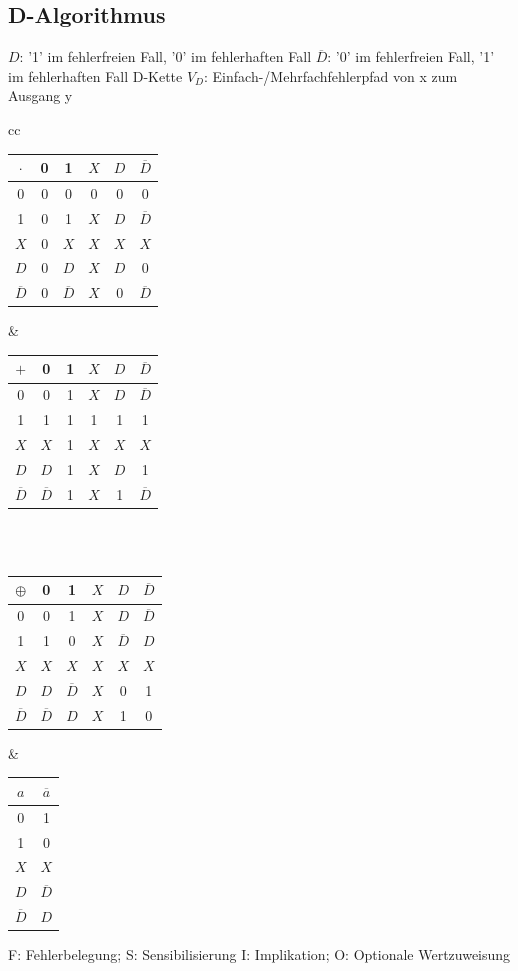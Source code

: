 \documentclass[a4paper,twocolumn,10pt]{article}
\begin{document}
\subsection*{D-Algorithmus}
$D$: '1' im fehlerfreien Fall, '0' im fehlerhaften Fall
$\overline{D}$: '0' im fehlerfreien Fall, '1' im fehlerhaften Fall
D-Kette $V_D$: Einfach-/Mehrfachfehlerpfad von x zum Ausgang y\newline
\begin{tabular}{cc}
\begin{tabular}{c|ccccc}
$\cdot$ & 0 & 1 & $X$ & $D$ & $\overline{D}$ \\ 
\hline 0 & 0 & 0 & 0 & 0 & 0 \\ 
1 & 0 & 1 & $X$ & $D$ & $\overline{D}$ \\ 
$X$ & 0 & $X$ & $X$ & $X$ & $X$ \\ 
$D$ & 0 & $D$ & $X$ & $D$ & 0 \\ 
$\overline{D}$ & 0 & $\overline{D}$ & $X$ & 0 & $\overline{D}$ \\  
\end{tabular} &        
\begin{tabular}{c|ccccc}
$+$ & 0 & 1 & $X$ & $D$ & $\overline{D}$ \\ 
\hline 0 & 0 & 1 & $X$ & $D$ & $\overline{D}$ \\ 
1 & 1 & 1 & 1 & 1 & 1 \\ 
$X$ & $X$ & 1 & $X$ & $X$ & $X$ \\ 
$D$ & $D$ & 1 & $X$ & $D$ & 1 \\ 
$\overline{D}$ & $\overline{D}$ & 1 & $X$ & 1 & $\overline{D}$ \\  
\end{tabular} \\\\
\begin{tabular}{c|ccccc}
$\oplus$ & 0 & 1 & $X$ & $D$ & $\overline{D}$ \\ 
\hline 0 & 0 & 1 & $X$ & $D$ & $\overline{D}$ \\ 
1 & 1 & 0 & $X$ & $\overline{D}$ & $D$ \\ 
$X$ & $X$ & $X$ & $X$ & $X$ & $X$ \\ 
$D$ & $D$ & $\overline{D}$ & $X$ & 0 & 1 \\ 
$\overline{D}$ & $\overline{D}$ & $D$ & $X$ & 1 & 0 \\ 
\end{tabular} &
\begin{tabular}{c|c}
$a$ & $\overline{a}$ \\
\hline 0 & 1 \\
1 & 0 \\
$X$ & $X$ \\
$D$ & $\overline{D}$ \\
$\overline{D}$ & $D$ \\
\end{tabular} 
\end{tabular}\newline
F: Fehlerbelegung; S: Sensibilisierung
I: Implikation; O: Optionale Wertzuweisung
\end{document}
